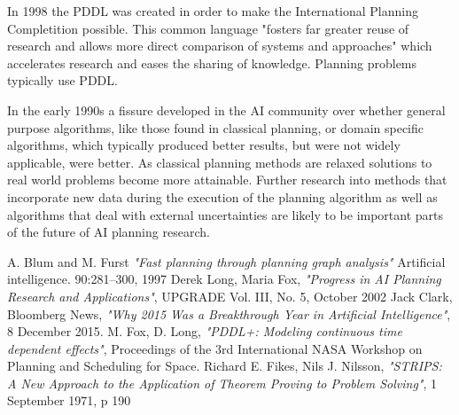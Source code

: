\documentclass[10pt, a4paper]{article}
\begin{document}
In 1998 the PDDL was created in order to make the International Planning Completition possible. 
This common language "fosters far greater reuse of research and allows more direct comparison of systems and approaches"\cite{mfox}
which accelerates research and eases the sharing of knowledge.  Planning problems typically use PDDL.

In the early 1990s a fissure developed in the AI community over whether general purpose algorithms, like those found in classical planning, or domain
specific algorithms, which typically produced better results, but were not widely applicable, were better.  As classical planning methods are relaxed
solutions to real world problems become more attainable.  Further research into methods that incorporate new data during the execution of the planning algorithm as well
as algorithms that deal with external uncertainties are likely to be important parts of the future of AI planning research.

\begin{thebibliography}{9}

A. Blum and M. Furst \emph{"Fast planning through planning graph analysis"} Artificial intelligence. 90:281–300, 1997 
Derek Long, Maria Fox, \emph{"Progress	in AI Planning Research and Applications"}, UPGRADE Vol. III, No. 5, October 2002
Jack Clark, Bloomberg News, \emph{"Why 2015 Was a Breakthrough Year in Artificial Intelligence"}, 8 December 2015.
M. Fox, D. Long, \emph{"PDDL+: Modeling continuous time dependent effects"}, Proceedings of the 3rd International NASA Workshop on Planning and Scheduling for Space.
Richard E. Fikes, Nils J. Nilsson, \emph{"STRIPS: A New Approach to the Application of Theorem Proving to Problem Solving"}, 1 September 1971, p 190

\end{thebibliography}
\end{document}
